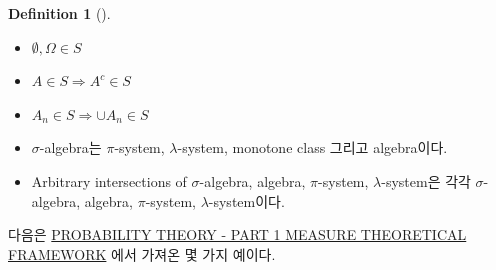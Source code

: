 \documentclass[
  13pt,
  letterpaper,
  DIV=11,
  numbers=noendperiod]{scrreprt}
\providecommand{\tightlist}{%
  \setlength{\itemsep}{0pt}\setlength{\parskip}{0pt}}\usepackage{longtable,booktabs,array}
\theoremstyle{plain}
\theoremstyle{definition}
\theoremstyle{definition}
\newtheorem{definition}{Definition}[chapter]
\theoremstyle{plain}
\theoremstyle{definition}
\theoremstyle{plain}
\theoremstyle{remark}
\begin{document}
\begin{definition}[]
\begin{enumerate}
  \begin{itemize}
  \tightlist
  \item
    \(\emptyset, \Omega \in S\)
  \item
    \(A \in S \Longrightarrow A^c \in S\)
  \item
    \(A_n \in S \Longrightarrow \cup A_n \in S\)
  \end{itemize}
\end{enumerate}

\end{definition}

\begin{tcolorbox}[enhanced jigsaw, opacitybacktitle=0.6, bottomrule=.15mm, title=\textcolor{quarto-callout-tip-color}{\faLightbulb}\hspace{0.5em}{Remark}, leftrule=.75mm, rightrule=.15mm, arc=.35mm, left=2mm, titlerule=0mm, colbacktitle=quarto-callout-tip-color!10!white, bottomtitle=1mm, colframe=quarto-callout-tip-color-frame, toptitle=1mm, coltitle=black, breakable, colback=white, toprule=.15mm, opacityback=0]

\begin{itemize}
\item
  \(\sigma\)-algebra는 \(\pi\)-system, \(\lambda\)-system, monotone
  class 그리고 algebra이다.
\item
  Arbitrary intersections of \(\sigma\)-algebra, algebra,
  \(\pi\)-system, \(\lambda\)-system은 각각 \(\sigma\)-algebra, algebra,
  \(\pi\)-system, \(\lambda\)-system이다.
\end{itemize}

\end{tcolorbox}

다음은
\href{https://math.iisc.ac.in/~manju/PT2019/Lectures-part1.pdf}{PROBABILITY
THEORY - PART 1 MEASURE THEORETICAL FRAMEWORK} 에서 가져온 몇 가지
예이다.
\end{document}
